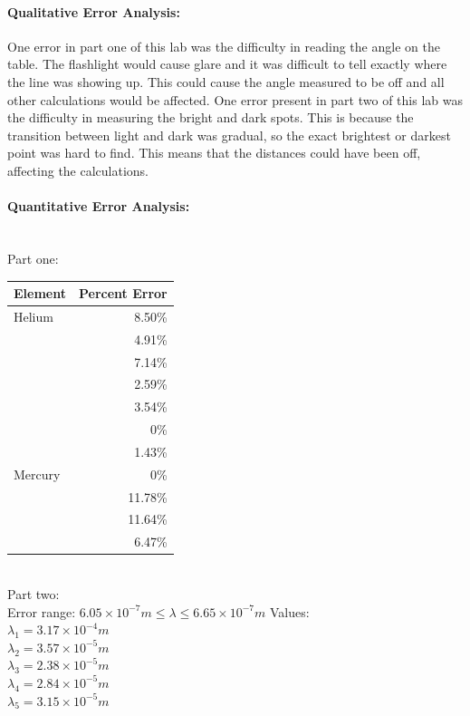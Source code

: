 \documentclass[12pt]{article}
\begin{document}
\paragraph{Qualitative Error Analysis:} One error in part one of this lab was the difficulty in reading the angle on the table. The flashlight would cause glare and it was difficult to tell exactly where the line was showing up. This could cause the angle measured to be off and all other calculations would be affected. One error present in part two of this lab was the difficulty in measuring the bright and dark spots. This is because the transition between light and dark was gradual, so the exact brightest or darkest point was hard to find. This means that the distances could have been off, affecting the calculations.

\paragraph{Quantitative Error Analysis:} \mbox{} \\
Part one:
\begin{tabular}{| l | r |}
	\hline
	Element & Percent Error \\ \hline
	Helium & 8.50\% \\
	& 4.91\% \\
	& 7.14\% \\
	& 2.59\% \\
	& 3.54\% \\
	& 0\% \\
	& 1.43\% \\	\hline
	Mercury & 0\% \\
	& 11.78\% \\
	& 11.64\% \\
	&  6.47\% \\ \hline
\end{tabular} \mbox{} \\
Part two: \mbox{} \\
Error range: 
$6.05 \times 10^{-7}m \leq \lambda \leq 6.65 \times 10^{-7}m$
Values: \mbox{} \\
$\lambda_1 = 3.17 \times 10^{-4}m$ \mbox{} \\
$\lambda_2 = 3.57 \times 10^{-5}m$ \mbox{} \\
$\lambda_3 = 2.38 \times 10^{-5}m$ \mbox{} \\
$\lambda_4 = 2.84 \times 10^{-5}m$ \mbox{} \\
$\lambda_5 = 3.15 \times 10^{-5}m$
\end{document}

